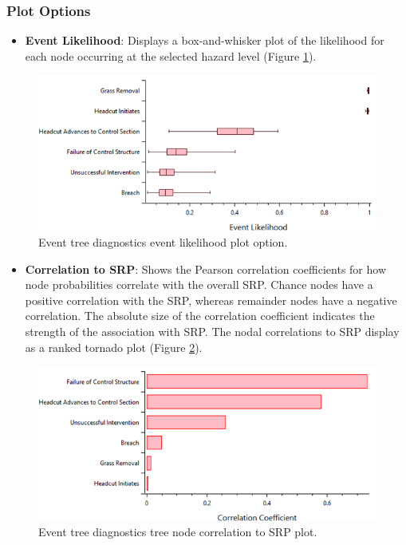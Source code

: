\documentclass[
]{book}
\providecommand{\tightlist}{%
  \setlength{\itemsep}{0pt}\setlength{\parskip}{0pt}}
\begin{document}
\hypertarget{plot-options}{%
\subsubsection*{Plot Options}\label{plot-options}}

\begin{itemize}
\tightlist
\item
  \textbf{Event Likelihood}: Displays a box-and-whisker plot of the likelihood for each node occurring at the selected hazard level (Figure \ref{fig:figure-94}).
\end{itemize}

\begin{figure}

{\centering \includegraphics{images/figure94} 

}

\caption{Event tree diagnostics event likelihood plot option.}\label{fig:figure-94}
\end{figure}

\begin{itemize}
\tightlist
\item
  \textbf{Correlation to SRP}: Shows the Pearson correlation coefficients for how node probabilities correlate with the overall SRP. Chance nodes have a positive correlation with the SRP, whereas remainder nodes have a negative correlation. The absolute size of the correlation coefficient indicates the strength of the association with SRP. The nodal correlations to SRP display as a ranked tornado plot (Figure \ref{fig:figure-95}).
\end{itemize}

\begin{figure}

{\centering \includegraphics{images/figure95} 

}

\caption{Event tree diagnostics tree node correlation to SRP plot.}\label{fig:figure-95}
\end{figure}
\end{document}
